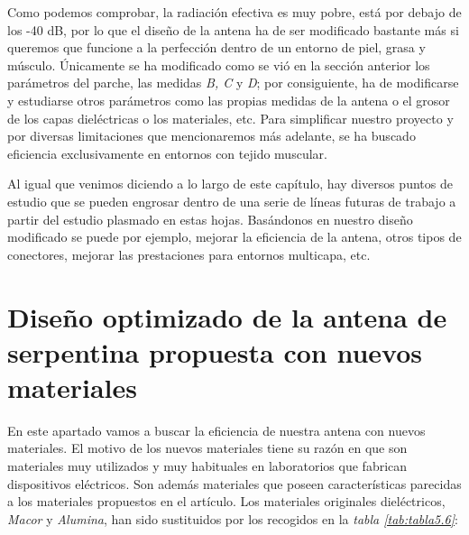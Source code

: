 Como podemos comprobar, la radiación efectiva es muy pobre, está por debajo de los -40 dB, por lo que el diseño de la antena ha de ser modificado bastante más si queremos que funcione a la perfección dentro de un entorno de piel, grasa y músculo. Únicamente se ha modificado como se vió en la sección anterior los parámetros del parche, las medidas \textit{B, C} y \textit{D}; por consiguiente, ha de modificarse y estudiarse otros parámetros como las propias medidas de la antena o el grosor de los capas dieléctricas o los materiales, etc. Para simplificar nuestro proyecto y por diversas limitaciones que mencionaremos más adelante, se ha buscado eficiencia exclusivamente en entornos con tejido muscular.

Al igual que venimos diciendo a lo largo de este capítulo, hay diversos puntos de estudio que se pueden engrosar dentro de una serie de líneas futuras de trabajo a partir del estudio plasmado en estas hojas. Basándonos en nuestro diseño modificado se puede por ejemplo, mejorar la eficiencia de la antena, otros tipos de conectores, mejorar las prestaciones para entornos multicapa, etc.


\section{Diseño optimizado de la antena de serpentina propuesta con nuevos materiales}\label{sec:optimizado}

En este apartado vamos a buscar la eficiencia de nuestra antena con nuevos materiales. El motivo de los nuevos materiales tiene su razón en que son materiales muy utilizados y muy habituales en laboratorios que fabrican dispositivos eléctricos. Son además materiales que poseen características parecidas a los materiales propuestos en el artículo. Los materiales originales dieléctricos, \textit{Macor} y \textit{Alumina}, han sido sustituidos por los recogidos en la \textit{tabla \ref{tab:tabla5.6}}:


